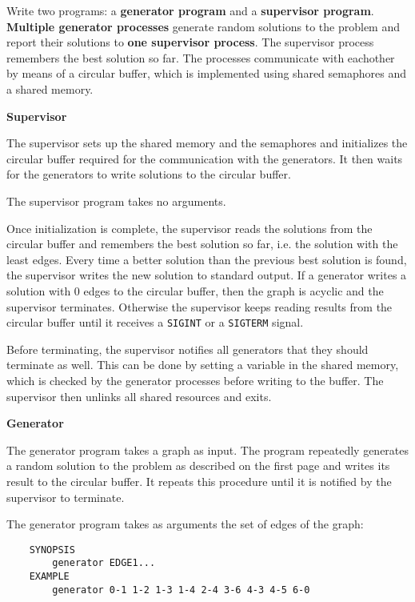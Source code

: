 Write two programs: a \textbf{generator program} and a \textbf{supervisor program}.
\textbf{Multiple generator processes} generate random solutions to the problem
and report their solutions to \textbf{one supervisor process}.
The supervisor process remembers the best solution so far.
The processes communicate with eachother by means of a circular buffer,
which is implemented using shared semaphores and a shared memory.

\textbf{Supervisor}

\vspace{-2mm}
The supervisor sets up the shared memory and the semaphores
and initializes the circular buffer
required for the communication with the generators.
It then waits for the generators to write solutions to the circular buffer.

The supervisor program takes no arguments.

Once initialization is complete,
the supervisor reads the solutions from the circular buffer
and remembers the best solution so far, i.e. the solution with the least edges.
Every time a better solution than the previous best solution is found,
the supervisor writes the new solution to standard output.
If a generator writes a solution with 0 edges to the circular buffer,
then the graph is acyclic and the supervisor terminates.
Otherwise the supervisor keeps reading results from the circular buffer
until it receives a \texttt{SIGINT} or a \texttt{SIGTERM} signal.

Before terminating, the supervisor notifies all generators
that they should terminate as well.
This can be done by setting a variable in the shared memory,
which is checked by the generator processes before writing to the buffer.
The supervisor then unlinks all shared resources and exits.

\textbf{Generator}

\vspace{-2mm}
The generator program takes a graph as input.
The program repeatedly generates a random solution to the problem as described on the first page
and writes its result to the circular buffer.
It repeats this procedure until it is notified by the supervisor to terminate.

The generator program takes as arguments the set of edges of the graph:

\begin{verbatim}
    SYNOPSIS
        generator EDGE1...
    EXAMPLE
        generator 0-1 1-2 1-3 1-4 2-4 3-6 4-3 4-5 6-0
\end{verbatim}

